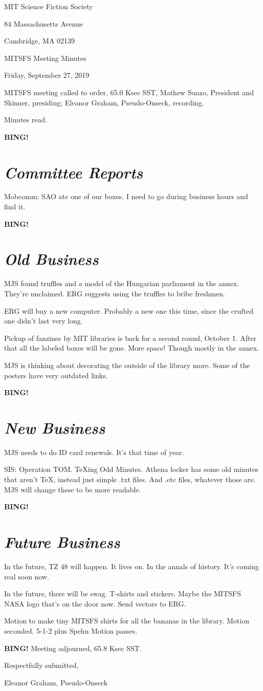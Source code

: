 \documentclass[10pt]{article}
\newcommand{\bing}{{\bf BING!} }
\newcommand{\goto}[1]{\bing \vskip 12pt \section*{{\em{#1}}}}
\newcommand{\ps}{ plus Spehn\xspace}
\newcommand{\skinner}{Mathew Suazo, President and Skinner}
\newcommand{\onseck}{Eleanor Graham, Pseudo-Onseck}
\newcommand{\meetingdate}{Friday, September 27, 2019 }
\begin{document}
\begin{center}

MIT Science Fiction Society

84 Massachusetts Avenue

Cambridge, MA 02139

\vspace{12pt}

MITSFS Meeting Minutes

\meetingdate

\end{center}

\vspace{18pt}

\setlength{\parskip}{6pt}

\noindent
MITSFS meeting called to order, 65.0 Ksec SST,
\skinner, presiding; \onseck, recording.

Minutes read.

\goto{Committee Reports}

Mobcomm: SAO ate one of our boxes. I need to go during business hours and find it.

\goto{Old Business}

MJS found truffles and a model of the Hungarian parliament in the annex. They're unclaimed. ERG suggests using the truffles to bribe freshmen. 

ERG will buy a new computer. Probably a new one this time, since the crufted one didn't last very long.

Pickup of fanzines by MIT libraries is back for a second round, October 1. After that all the labeled boxes will be gone. More space! Though mostly in the annex.

MJS is thinking about decorating the outside of the library more. Some of the posters have very outdated links.

\goto{New Business}

MJS needs to do ID card renewals. It's that time of year.

SIS: Operation TOM. TeXing Odd Minutes. Athena locker has some old minutes that aren't TeX, instead just simple .txt files. And .etc files, whatever those are. MJS will change these to be more readable.

\goto{Future Business}

In the future, TZ 48 will happen. It lives on. In the annals of history. It's coming real soon now. 

In the future, there will be swag. T-shirts and stickers. Maybe the MITSFS NASA logo that's on the door now. Send vectors to ERG. 

Motion to make tiny MITSFS shirts for all the bananas in the library. Motion seconded. 
5-1-2\ps
Motion passes.

\bing
\noindent
Meeting adjourned, 65.8 Ksec SST.

\vspace{18pt}

\centerline{Respectfully submitted,}
\centerline{\onseck}
\end{document}
